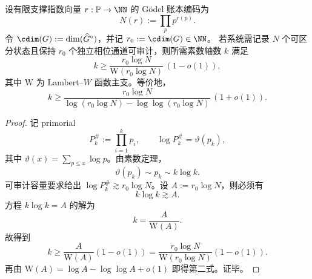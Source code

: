\begin{theorem}\label{thm:xi-terminal-zm-cdim-prime-ledger-lambertw-lower-bound}
设有限支撑指数向量 \(r:\mathbb P\to\NN\) 的 Gödel 账本编码为
\[
N(r):=\prod_{p}p^{r(p)}.
\]
令 \(\cdim(G):=\dim(\widehat G^\circ)\)，并记 \(r_0:=\cdim(G)\in\NN\)。
若系统需记录 \(N\) 个可区分状态且保持 \(r_0\) 个独立相位通道可审计，则所需素数轴数 \(k\) 满足
\[
k\ge \frac{r_0\log N}{\mathrm W(r_0\log N)}\,(1-o(1)),
\]
其中 \(\mathrm W\) 为 Lambert--\(W\) 函数主支。等价地，
\[
k\ge
\frac{r_0\log N}
{\log(r_0\log N)-\log\log(r_0\log N)}\,(1+o(1)).
\]
\end{theorem}
\begin{proof}
记 primorial
\[
P_k^\#:=\prod_{i=1}^k p_i,\qquad \log P_k^\#=\vartheta(p_k),
\]
其中 \(\vartheta(x)=\sum_{p\le x}\log p\)。由素数定理，
\[
\vartheta(p_k)\sim p_k\sim k\log k.
\]
可审计容量要求给出 \(\log P_k^\#\gtrsim r_0\log N\)。设
\(
A:=r_0\log N
\)，则必须有
\[
k\log k\gtrsim A.
\]
方程 \(k\log k=A\) 的解为
\[
k=\frac{A}{\mathrm W(A)}.
\]
故得到
\[
k\ge \frac{A}{\mathrm W(A)}(1-o(1))
=\frac{r_0\log N}{\mathrm W(r_0\log N)}(1-o(1)).
\]
再由
\(
\mathrm W(A)=\log A-\log\log A+o(1)
\)
即得第二式。证毕。
\end{proof}

